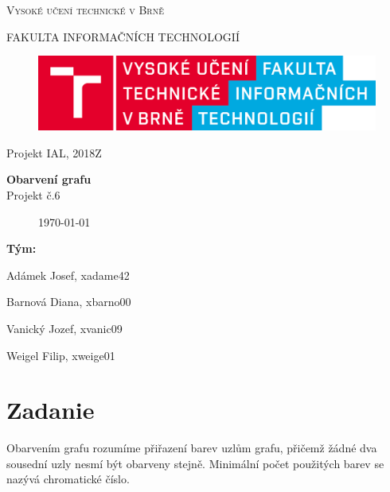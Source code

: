 \documentclass[a4paper,11pt]{article}
\begin{document}

\begin{titlepage}
\begin{center}
    {\Huge \textsc{Vysoké učení technické v Brně}}
    
    {\LARGE \uppercase{FAKULTA INFORMAČNÍCH TECHNOLOGIÍ}}
    
\begin{figure}[h]
\vspace{5.0cm}
\centering
\includegraphics[scale=0.15]{logo.png}
\vspace{-10.0cm}
\end{figure}
    
	{\LARGE Projekt IAL, 2018Z}

	{\Huge \textbf{Obarvení grafu}}
\\

{\LARGE {Projekt č.6}}\\

\begin{figure}[h]
\centering
{\Large {\mydate\today}}
\vspace{6cm}
\end{figure}

\end{center}
\begin{compactitem}
\item[] \textbf{Tým:}
\item[] Adámek Josef, xadame42
\item[] Barnová Diana, xbarno00
\item[] Vanický Jozef, xvanic09
\item[] Weigel Filip, xweige01
\end{compactitem}

\end{titlepage}

\tableofcontents
\newpage

\section{Zadanie}
Obarvením grafu rozumíme přiřazení barev uzlům grafu, přičemž žádné dva sousední uzly nesmí být obarveny stejně. Minimální počet použitých barev se nazývá chromatické číslo.
\end{document}
